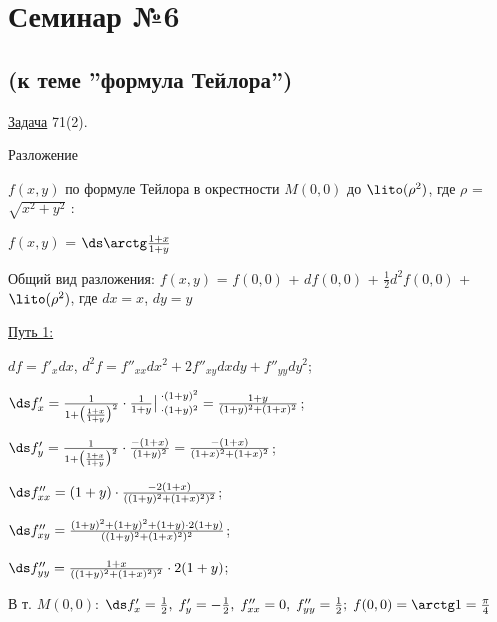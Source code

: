 \newcommand{\coursename}{Математический анализ 1 к. 2 с.}
\newcommand{\compiledby}{А. Трошин, ai-troshin@yandex.ru}
\newcommand{\coursedate}{Весна 2018 г.}



\section{Семинар №6}

\subsection{(к теме ''формула Тейлора'')}

\underline{Задача}  71(2).

Разложение \; \parbox[t]{0.95\linewidth}{$f(x,y)$\; по формуле Тейлора в окрестности \;$M(0,0)$\; до \;$\lito(\rho^2)$\;, где \;$\rho$ = $\sqrt{x^2+y^2}$ :

\; $f(x,y)$ = $\ds \arctg\frac{1+x}{1+y}$}

Общий вид разложения:
$f(x,y)$ = $f(0,0)$ + $df(0,0)$ + $\frac{1}{2}d^2f(0,0)$ + $\lito(\rho^2)$, где\; $dx = x$,\; $dy=y$

\underline{Путь 1:}\; \parbox[t]{0.95\linewidth}{ $df = f'_xdx$, \; $d^2f = f''_{xx}dx^2 + 2f''_{xy}dxdy + f''_{yy}dy^2$;

\smallskip

$\ds f'_x = \frac{1}{1 + \big(\frac{1+x}{1+y}\big)^2} \cdot \frac{1}{1+y}\big|_{\; \cdot (1+y)^2}^{\; \cdot (1+y)^2} = \frac{1+y}{(1+y)^2 + (1+x)^2}$;

\smallskip
 
$\ds f'_y = \frac{1}{1 + \big(\frac{1+x}{1+y}\big)^2} \cdot \frac{-(1+x)}{(1+y)^2} = \frac{-(1+x)}{(1+x)^2+(1+x)^2}$;

\smallskip

$\ds f''_{xx} = (1+y) \cdot \frac{-2(1+x)}{((1+y)^2+(1+x)^2)^2}$;

\smallskip
\smallskip

$\ds f''_{xy} = \frac{(1+y)^2+(1+y)^2 + (1+y) \cdot 2(1+y)}{((1+y)^2+(1+x)^2)^2}$;

\smallskip

$\ds f''_{yy} = \frac{1+x}{((1+y)^2+(1+x)^2)^2} \cdot 2(1+y)$;}

В т. $M(0,0)$: \; $ \ds f'_x = \frac{1}{2}, \; f'_y = -\frac{1}{2}, \; f''_{xx} = 0, \; f''_{yy} = \frac{1}{2}; \; f(0,0) = \arctg1 = \frac{\pi}{4}$

